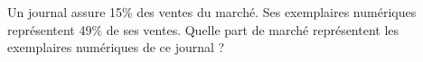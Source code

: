 
Un journal assure 15\% des ventes du marché. Ses exemplaires numériques représentent 49\% de ses ventes.
Quelle part de marché représentent les exemplaires numériques de ce journal ?
 